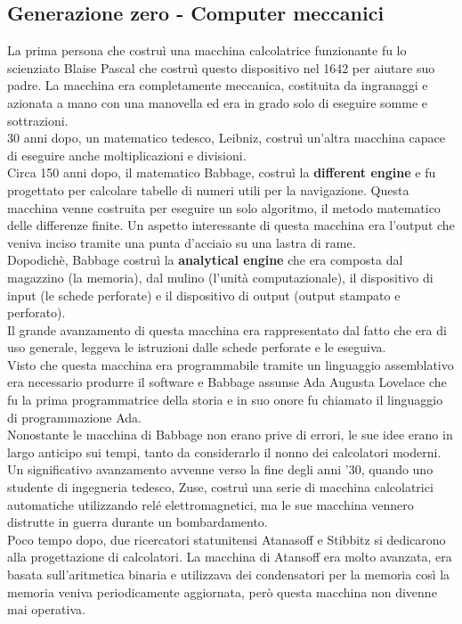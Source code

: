 \documentclass[12pt]{report}
\begin{document}
		\subsection{Generazione zero - Computer meccanici}
		La prima persona che costruì una macchina calcolatrice funzionante fu lo scienziato Blaise Pascal che costruì questo dispositivo nel 1642 per aiutare suo padre. La macchina era completamente meccanica, costituita da ingranaggi e azionata a mano con una manovella ed era in grado solo di eseguire somme e sottrazioni. \\
		30 anni dopo, un matematico tedesco, Leibniz, costruì un'altra macchina capace di eseguire anche moltiplicazioni e divisioni. \\
		Circa 150 anni dopo, il matematico Babbage, costruì la \textbf{different engine} e fu progettato per calcolare tabelle di numeri utili per la navigazione. Questa macchina venne costruita per eseguire un solo algoritmo, il metodo matematico delle differenze finite. Un aspetto interessante di questa macchina era l'output che veniva inciso tramite una punta d'acciaio su una lastra di rame. \\
		Dopodichè, Babbage costruì la \textbf{analytical engine} che era composta dal magazzino (la memoria), dal mulino (l'unità computazionale), il dispositivo di input (le schede perforate) e il dispositivo di output (output stampato e perforato). \\
		Il grande avanzamento di questa macchina era rappresentato dal fatto che era di uso generale, leggeva le istruzioni dalle schede perforate e le eseguiva. \\
		Visto che questa macchina era programmabile tramite un linguaggio assemblativo era necessario produrre il software e Babbage assunse Ada Augusta Lovelace che fu la prima programmatrice della storia e in suo onore fu chiamato il linguaggio di programmazione Ada. \\
		Nonostante le macchina di Babbage non erano prive di errori, le sue idee erano in largo anticipo sui tempi, tanto da considerarlo il nonno dei calcolatori moderni. \\
		Un significativo avanzamento avvenne verso la fine degli anni '30, quando uno studente di ingegneria tedesco, Zuse, costruì una serie di macchina calcolatrici automatiche utilizzando relé elettromagnetici, ma le sue macchina vennero distrutte in guerra durante un bombardamento. \\
		Poco tempo dopo, due ricercatori statunitensi Atanasoff e Stibbitz si dedicarono alla progettazione di calcolatori. La macchina di Atansoff era molto avanzata, era basata sull'aritmetica binaria e utilizzava dei condensatori per la memoria così la memoria veniva periodicamente aggiornata, però questa macchina non divenne mai operativa. \\
\end{document}
